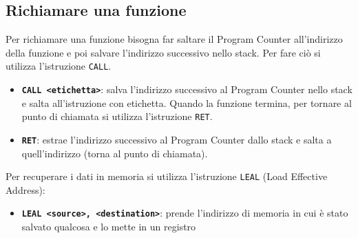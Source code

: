 \documentclass[a4paper]{article}
\theoremstyle{break}
\theoremstyle{break}
\theoremstyle{break}
\theoremstyle{break}
\begin{document}
\subsection{Richiamare una funzione}
Per richiamare una funzione bisogna far saltare il Program Counter all'indirizzo della funzione
e poi salvare l'indirizzo successivo nello stack. Per fare ciò si utilizza l'istruzione \texttt{CALL}.
\begin{itemize}
	\item \textbf{\texttt{CALL <etichetta>}}: salva l'indirizzo successivo al Program Counter nello stack e salta all'istruzione con etichetta.
	      Quando la funzione termina, per tornare al punto di chiamata si utilizza l'istruzione \texttt{RET}.
	\item \textbf{\texttt{RET}}: estrae l'indirizzo successivo al Program Counter dallo stack e salta a quell'indirizzo (torna al punto di chiamata).
\end{itemize}

Per recuperare i dati in memoria si utilizza l'istruzione \texttt{LEAL} (Load Effective Address):
\begin{itemize}
	\item \textbf{\texttt{LEAL <source>, <destination>}}: prende l'indirizzo di memoria in cui è stato salvato qualcosa
	      e lo mette in un registro
\end{itemize}
\end{document}
